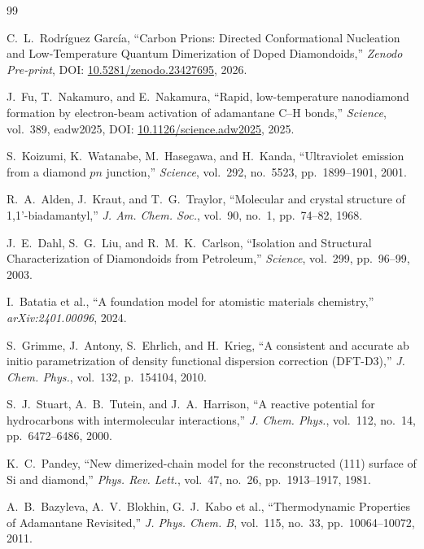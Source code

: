 \documentclass[10pt,twocolumn,a4paper]{article}
\begin{document}
\begin{thebibliography}{99}
\footnotesize\linespread{0.95}\selectfont
\setlength{\itemsep}{-1.0pt}
\setlength{\parskip}{0pt}

C.~L.~Rodr\'iguez Garc\'ia, ``Carbon Prions: Directed Conformational Nucleation and Low-Temperature Quantum Dimerization of Doped Diamondoids,'' \textit{Zenodo Pre-print}, DOI: \href{https://doi.org/10.5281/zenodo.23427695}{10.5281/zenodo.23427695}, 2026.

J.~Fu, T.~Nakamuro, and E.~Nakamura, ``Rapid, low-temperature nanodiamond formation by electron-beam activation of adamantane C--H bonds,'' \textit{Science}, vol.~389, eadw2025, DOI: \href{https://doi.org/10.1126/science.adw2025}{10.1126/science.adw2025}, 2025.

S.~Koizumi, K.~Watanabe, M.~Hasegawa, and H.~Kanda, ``Ultraviolet emission from a diamond $pn$ junction,'' \textit{Science}, vol.~292, no.~5523, pp.~1899--1901, 2001.

R.~A.~Alden, J.~Kraut, and T.~G.~Traylor, ``Molecular and crystal structure of 1,1'-biadamantyl,'' \textit{J. Am. Chem. Soc.}, vol.~90, no.~1, pp.~74--82, 1968.

J.~E.~Dahl, S.~G.~Liu, and R.~M.~K.~Carlson, ``Isolation and Structural Characterization of Diamondoids from Petroleum,'' \textit{Science}, vol.~299, pp.~96--99, 2003.

I.~Batatia et al., ``A foundation model for atomistic materials chemistry,'' \textit{arXiv:2401.00096}, 2024.

S.~Grimme, J.~Antony, S.~Ehrlich, and H.~Krieg, ``A consistent and accurate ab initio parametrization of density functional dispersion correction (DFT-D3),'' \textit{J. Chem. Phys.}, vol.~132, p.~154104, 2010.

S.~J.~Stuart, A.~B.~Tutein, and J.~A.~Harrison, ``A reactive potential for hydrocarbons with intermolecular interactions,'' \textit{J. Chem. Phys.}, vol.~112, no.~14, pp.~6472--6486, 2000.

K.~C.~Pandey, ``New dimerized-chain model for the reconstructed (111) surface of Si and diamond,'' \textit{Phys. Rev. Lett.}, vol.~47, no.~26, pp.~1913--1917, 1981.

A.~B.~Bazyleva, A.~V.~Blokhin, G.~J.~Kabo et al., ``Thermodynamic Properties of Adamantane Revisited,'' \textit{J. Phys. Chem. B}, vol.~115, no.~33, pp.~10064--10072, 2011.


\end{thebibliography}
\end{document}
